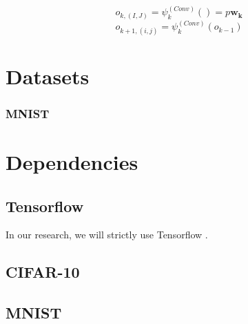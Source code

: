 $$ o_{k, (I,J)} = \psi_k^{(Conv)}() =  p\mathbf{w_k}$$
$$ o_{k+1,(i,j)} = \psi^{(Conv)}_k(o_{k-1}) $$

\section{Datasets}


\subsubsection{MNIST}

\section{Dependencies}
\subsection{Tensorflow}
In our research, we will strictly use Tensorflow \cite{abadi2016tensorflow}. 
\subsection{CIFAR-10}
\subsection{MNIST}




























